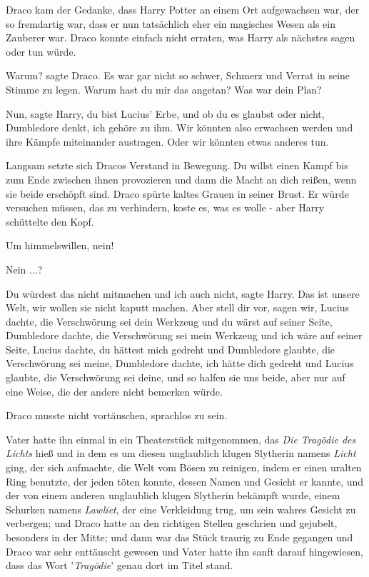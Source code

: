 Draco kam der Gedanke, dass Harry Potter an einem Ort aufgewachsen war, der so
fremdartig war, dass er nun tatsächlich eher ein magisches Wesen als ein
Zauberer war. Draco konnte einfach nicht erraten, was Harry als nächstes sagen
oder tun würde.

\glqq{}Warum?\grqq{} sagte Draco. Es war gar nicht so schwer, Schmerz und Verrat
in seine Stimme zu legen. \glqq{}Warum hast du mir das angetan? Was war dein
Plan?\grqq{}

\glqq{}Nun\grqq{}, sagte Harry, \glqq{}du bist Lucius' Erbe, und ob du es
glaubst oder nicht, Dumbledore denkt, ich gehöre zu ihm. Wir könnten also
erwachsen werden und ihre Kämpfe miteinander austragen. Oder wir könnten etwas
anderes tun.\grqq{}

Langsam setzte sich Dracos Verstand in Bewegung. \glqq{}Du willst einen Kampf
bis zum Ende zwischen ihnen provozieren und dann die Macht an dich reißen, wenn
sie beide erschöpft sind.\grqq{} Draco spürte kaltes Grauen in seiner Brust. Er
würde versuchen müssen, das zu verhindern, koste es, was es wolle - aber Harry
schüttelte den Kopf.

\glqq{}Um himmelswillen, nein!\grqq{}

\glqq{}Nein ...?\grqq{}

\glqq{}Du würdest das nicht mitmachen und ich auch nicht\grqq{}, sagte Harry.
\glqq{}Das ist unsere Welt, wir wollen sie nicht kaputt machen. Aber stell dir
vor, sagen wir, Lucius dachte, die Verschwörung sei dein Werkzeug und du wärst
auf seiner Seite, Dumbledore dachte, die Verschwörung sei mein Werkzeug und ich
wäre auf seiner Seite, Lucius dachte, du hättest mich gedreht und Dumbledore
glaubte, die Verschwörung sei meine, Dumbledore dachte, ich hätte dich gedreht
und Lucius glaubte, die Verschwörung sei deine, und so halfen sie uns beide,
aber nur auf eine Weise, die der andere nicht bemerken würde.\grqq{}

Draco musste nicht vortäuschen, sprachlos zu sein.

Vater hatte ihn einmal in ein Theaterstück mitgenommen, das \emph{\glqq{}Die
Tragödie des Lichts\grqq{}} hieß und in dem es um diesen unglaublich klugen
Slytherin namens \emph{Licht} ging, der sich aufmachte, die Welt vom Bösen zu
reinigen, indem er einen uralten Ring benutzte, der jeden töten konnte, dessen
Namen und Gesicht er kannte, und der von einem anderen unglaublich klugen
Slytherin bekämpft wurde, einem Schurken namens \emph{Lawliet}, der eine
Verkleidung trug, um sein wahres Gesicht zu verbergen; und Draco hatte an den
richtigen Stellen geschrien und gejubelt, besonders in der Mitte; und dann war
das Stück traurig zu Ende gegangen und Draco war sehr enttäuscht gewesen und
Vater hatte ihn sanft darauf hingewiesen, dass das Wort '\emph{Tragödie}' genau
dort im Titel stand.

